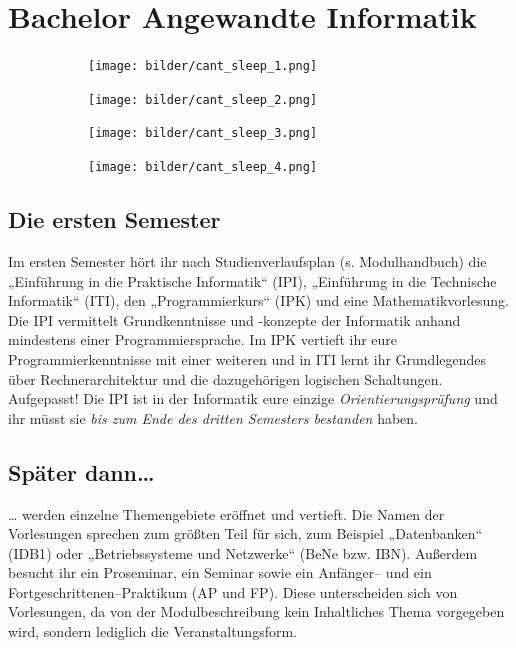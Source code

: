 \section{Bachelor Angewandte Informatik}

\begin{figure}[b]
    \begin{subfigure}{.23\textwidth}
	    \texttt{[image: bilder/cant\_sleep\_1.png]}
    \end{subfigure}
    \hfill
    \begin{subfigure}{.23\textwidth}
	    \texttt{[image: bilder/cant\_sleep\_2.png]}
    \end{subfigure}
    \hfill
    \begin{subfigure}{.23\textwidth}
	    \texttt{[image: bilder/cant\_sleep\_3.png]}
    \end{subfigure}
    \hfill
    \begin{subfigure}{.23\textwidth}
	    \texttt{[image: bilder/cant\_sleep\_4.png]}
    \end{subfigure}

\end{figure}

\subsection{Die ersten Semester}

Im ersten Semester hört ihr nach Studienverlaufsplan (s. Modulhandbuch) die „Einführung in die Praktische Informatik“ (\gls{IPI}), „Einführung in die Technische Informatik“ (\gls{ITI}), den „Programmierkurs“ (\gls{IPK}) und eine Mathematikvorlesung. Die IPI vermittelt Grundkenntnisse und -konzepte der Informatik anhand mindestens einer Programmiersprache. Im IPK vertieft ihr eure Programmierkenntnisse mit einer weiteren und in ITI lernt ihr Grundlegendes über Rechnerarchitektur und die dazugehörigen logischen Schaltungen. Aufgepasst! Die IPI ist in der Informatik eure einzige \emph{Orientierungsprüfung} und ihr müsst sie \emph{bis zum Ende des dritten Semesters bestanden} haben.


\subsection{Später dann\dots{}}

\dots{} werden einzelne Themengebiete eröffnet und vertieft. Die Namen der Vorlesungen sprechen zum größten Teil für sich, zum Beispiel „Datenbanken“ (\gls{IDB1}) oder „Betriebssysteme und Netzwerke“ (\gls{BeNe} bzw. IBN). Außerdem besucht ihr ein Proseminar, ein Seminar sowie ein An\-fän\-ger-- und ein Fortgeschrittenen--Praktikum (\gls{AP} und \gls{FP}). Diese unterscheiden sich von Vorlesungen, da von der Modulbeschreibung kein Inhaltliches Thema vorgegeben wird, sondern lediglich die Veranstaltungsform.


